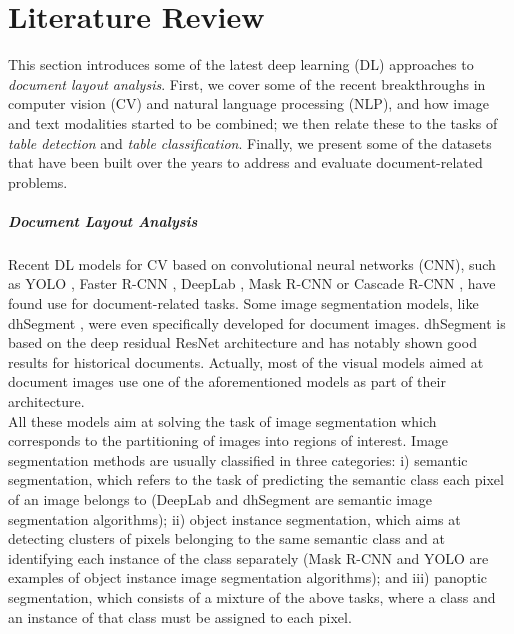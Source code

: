 \chapter{Literature Review}
\label{literature_review}
This section introduces some of the latest deep learning (DL) approaches to \textit{document layout analysis}. First, we cover some of the recent breakthroughs in computer vision (CV) and natural language processing (NLP), and how image and text modalities started to be combined; we then relate these to the tasks of \textit{table detection} and \textit{table classification}. Finally, we present some of the datasets that have been built over the years to address and evaluate document-related problems.

\paragraph{Document Layout Analysis}
Recent DL models for CV based on convolutional neural networks (CNN), such as YOLO \citep{redmon_you_2016}, Faster R-CNN \citep{ren_faster_2016}, DeepLab \citep{chen_deeplab_2017}, Mask R-CNN \citep{huang_mask_2019} or Cascade R-CNN \citep{cai_cascade_2021}, have found use for document-related tasks. Some image segmentation models, like dhSegment \citep{ares_oliveira_dhsegment_2018}, were even specifically developed for document images. dhSegment is based on the deep residual ResNet architecture \citep{he_deep_2015} and has notably shown good results for historical documents. Actually, most of the visual models aimed at document images use one of the aforementioned models as part of their architecture.  \\
All these models aim at solving the task of image segmentation which corresponds to the partitioning of images into regions of interest. Image segmentation methods are usually classified in three categories: i) semantic segmentation, which refers to the task of predicting the semantic class each pixel of an image belongs to (DeepLab and dhSegment are semantic image segmentation algorithms); ii) object instance segmentation, which aims at detecting clusters of pixels belonging to the same semantic class and at identifying each instance of the class separately (Mask R-CNN and YOLO are examples of object instance image segmentation algorithms); and iii) panoptic segmentation, which consists of a mixture of the above tasks, where a class and an instance of that class must be assigned to each pixel.\\
